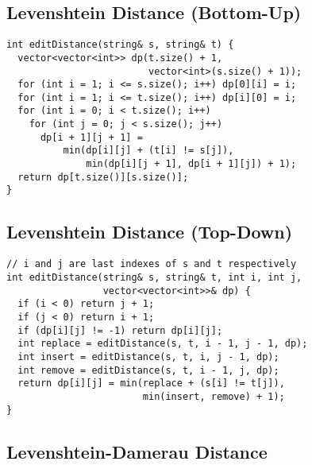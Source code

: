 \documentclass[twoside]{article}
\newcommand{\fileTitleStyle}{\large\underline}
\begin{document}
\begin{multicols*}{2}
\subsectionfont{\centering\bfseries\LARGE}
\subsectionfont{\fileTitleStyle}
\subsection*{Levenshtein Distance (Bottom-Up)}
\begin{verbatim}
int editDistance(string& s, string& t) {
  vector<vector<int>> dp(t.size() + 1,
                         vector<int>(s.size() + 1));
  for (int i = 1; i <= s.size(); i++) dp[0][i] = i;
  for (int i = 1; i <= t.size(); i++) dp[i][0] = i;
  for (int i = 0; i < t.size(); i++)
    for (int j = 0; j < s.size(); j++)
      dp[i + 1][j + 1] =
          min(dp[i][j] + (t[i] != s[j]),
              min(dp[i][j + 1], dp[i + 1][j]) + 1);
  return dp[t.size()][s.size()];
}
\end{verbatim}

\subsectionfont{\centering\bfseries\LARGE}
\subsectionfont{\fileTitleStyle}
\subsection*{Levenshtein Distance (Top-Down)}
\begin{verbatim}
// i and j are last indexes of s and t respectively
int editDistance(string& s, string& t, int i, int j,
                 vector<vector<int>>& dp) {
  if (i < 0) return j + 1;
  if (j < 0) return i + 1;
  if (dp[i][j] != -1) return dp[i][j];
  int replace = editDistance(s, t, i - 1, j - 1, dp);
  int insert = editDistance(s, t, i, j - 1, dp);
  int remove = editDistance(s, t, i - 1, j, dp);
  return dp[i][j] = min(replace + (s[i] != t[j]),
                        min(insert, remove) + 1);
}
\end{verbatim}

\subsectionfont{\centering\bfseries\LARGE}
\subsectionfont{\fileTitleStyle}
\subsection*{Levenshtein-Damerau Distance}
\begin{verbatim}

\end{verbatim}

\subsectionfont{\centering\bfseries\LARGE}
\subsectionfont{\fileTitleStyle}

\end{multicols*}
\end{document}
